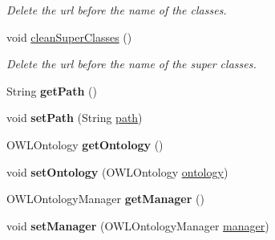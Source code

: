 \begin{DoxyCompactItemize}
\begin{DoxyCompactList}\small\item\em Delete the url before the name of the classes. \end{DoxyCompactList}\item 
\hypertarget{class_ontology_1_1_ontology_adfbd3af5b4506c74edbed5416e588ee6}{
void \hyperlink{class_ontology_1_1_ontology_adfbd3af5b4506c74edbed5416e588ee6}{cleanSuperClasses} ()}
\label{class_ontology_1_1_ontology_adfbd3af5b4506c74edbed5416e588ee6}

\begin{DoxyCompactList}\small\item\em Delete the url before the name of the super classes. \end{DoxyCompactList}\item 
\hypertarget{class_ontology_1_1_ontology_ae9cfbb719718be8b33769084b0ba7e0b}{
String {\bfseries getPath} ()}
\label{class_ontology_1_1_ontology_ae9cfbb719718be8b33769084b0ba7e0b}

\item 
\hypertarget{class_ontology_1_1_ontology_abb3b2c84c1859839c6977b00dbd9e02a}{
void {\bfseries setPath} (String \hyperlink{class_ontology_1_1_ontology_a70b39a7517df023757f3dd3a652cf879}{path})}
\label{class_ontology_1_1_ontology_abb3b2c84c1859839c6977b00dbd9e02a}

\item 
\hypertarget{class_ontology_1_1_ontology_a99b88c305a00321e13f8e83009d15c5c}{
OWLOntology {\bfseries getOntology} ()}
\label{class_ontology_1_1_ontology_a99b88c305a00321e13f8e83009d15c5c}

\item 
\hypertarget{class_ontology_1_1_ontology_a348ff8de8e4faee52779aa5f808bd73f}{
void {\bfseries setOntology} (OWLOntology \hyperlink{class_ontology_1_1_ontology_a0fe57c961d9d32854e141a7908f513f0}{ontology})}
\label{class_ontology_1_1_ontology_a348ff8de8e4faee52779aa5f808bd73f}

\item 
\hypertarget{class_ontology_1_1_ontology_ad667d0984a9104d1d52b6cd60126632f}{
OWLOntologyManager {\bfseries getManager} ()}
\label{class_ontology_1_1_ontology_ad667d0984a9104d1d52b6cd60126632f}

\item 
\hypertarget{class_ontology_1_1_ontology_a802994698b3a28c8ad6e31f2c02299cf}{
void {\bfseries setManager} (OWLOntologyManager \hyperlink{class_ontology_1_1_ontology_a23f7c60be021e9813bc3b004166b12d1}{manager})}
\label{class_ontology_1_1_ontology_a802994698b3a28c8ad6e31f2c02299cf}


\end{DoxyCompactItemize}
